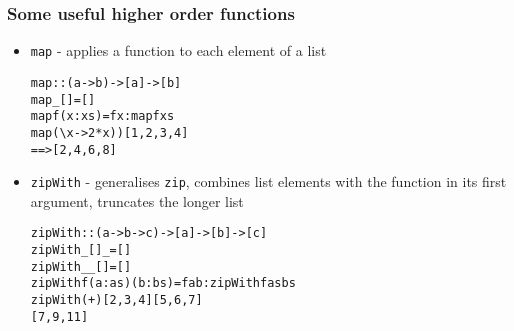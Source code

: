 \documentclass[final,handout]{beamer}
\begin{document}
\begin{frame}[fragile]
    \frametitle{Some useful higher order functions}
    \begin{itemize}
        \item<1-> \texttt{map} - applies a function to each element of a list
            \begin{alltt}
    map :: (a -> b) -> [a] -> [b]
    map _ []     = []
    map f (x:xs) = f x : map f xs
\pause
map (\textbackslash{}x -> 2 * x)) [1, 2, 3, 4]
    ==> [2, 4, 6, 8]
            \end{alltt}

        \item<3-> \texttt{zipWith} - generalises \texttt{zip}, combines list elements
            with the function in its first argument, truncates the longer list
            \begin{alltt}
    zipWith :: (a -> b -> c) -> [a] -> [b] -> [c]
    zipWith _ []     _      = []
    zipWith _ _    []       = []
    zipWith f (a:as) (b:bs) = f a b : zipWith f as bs
\pause
zipWith (+) [2, 3, 4] [5, 6, 7]
    [7, 9, 11]
            \end{alltt}
    \end{itemize}
\end{frame}
\end{document}
